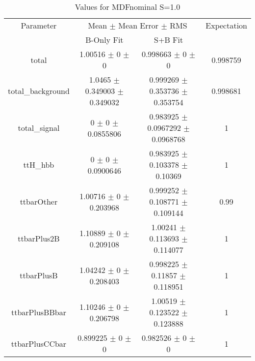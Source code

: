 \begin{table}
\centering
\caption{Values for MDFnominal S=1.0}
\begin{tabular}{cccc}
\toprule
Parameter & \multicolumn{2}{c}{Mean $\pm$ Mean Error $\pm$ RMS} & Expectation\\
 & B-Only Fit & S+B Fit & \\
\midrule
total & \num{1.00516} $\pm$ \num{0} $\pm$ \num{0} & \num{0.998663} $\pm$ \num{0} $\pm$ \num{0} & \num{0.998759}\\
total\_background & \num{1.0465} $\pm$ \num{0.349003} $\pm$ \num{0.349032} & \num{0.999269} $\pm$ \num{0.353736} $\pm$ \num{0.353754} & \num{0.998681}\\
total\_signal & \num{0} $\pm$ \num{0} $\pm$ \num{0.0855806} & \num{0.983925} $\pm$ \num{0.0967292} $\pm$ \num{0.0968768} & \num{1}\\
ttH\_hbb & \num{0} $\pm$ \num{0} $\pm$ \num{0.0900646} & \num{0.983925} $\pm$ \num{0.103378} $\pm$ \num{0.10369} & \num{1}\\
ttbarOther & \num{1.00716} $\pm$ \num{0} $\pm$ \num{0.203968} & \num{0.999252} $\pm$ \num{0.108771} $\pm$ \num{0.109144} & \num{0.99}\\
ttbarPlus2B & \num{1.10889} $\pm$ \num{0} $\pm$ \num{0.209108} & \num{1.00241} $\pm$ \num{0.113693} $\pm$ \num{0.114077} & \num{1}\\
ttbarPlusB & \num{1.04242} $\pm$ \num{0} $\pm$ \num{0.208403} & \num{0.998225} $\pm$ \num{0.11857} $\pm$ \num{0.118951} & \num{1}\\
ttbarPlusBBbar & \num{1.10246} $\pm$ \num{0} $\pm$ \num{0.206798} & \num{1.00519} $\pm$ \num{0.123522} $\pm$ \num{0.123888} & \num{1}\\
ttbarPlusCCbar & \num{0.899225} $\pm$ \num{0} $\pm$ \num{0} & \num{0.982526} $\pm$ \num{0} $\pm$ \num{0} & \num{1}\\
\bottomrule
\end{tabular}
\end{table}